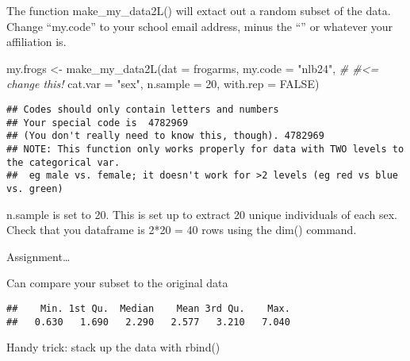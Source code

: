 \documentclass[
]{book}
\newenvironment{Shaded}{\begin{snugshade}}{\end{snugshade}}
\newcommand{\AttributeTok}[1]{\textcolor[rgb]{0.77,0.63,0.00}{#1}}
\newcommand{\CommentTok}[1]{\textcolor[rgb]{0.56,0.35,0.01}{\textit{#1}}}
\newcommand{\ConstantTok}[1]{\textcolor[rgb]{0.00,0.00,0.00}{#1}}
\newcommand{\DecValTok}[1]{\textcolor[rgb]{0.00,0.00,0.81}{#1}}
\newcommand{\FunctionTok}[1]{\textcolor[rgb]{0.00,0.00,0.00}{#1}}
\newcommand{\NormalTok}[1]{#1}
\newcommand{\OtherTok}[1]{\textcolor[rgb]{0.56,0.35,0.01}{#1}}
\newcommand{\SpecialCharTok}[1]{\textcolor[rgb]{0.00,0.00,0.00}{#1}}
\newcommand{\StringTok}[1]{\textcolor[rgb]{0.31,0.60,0.02}{#1}}
\begin{document}
The function make\_my\_data2L() will extact out a random subset of the data. Change ``my.code'' to your school email address, minus the ``\citet{pitt.edu}'' or whatever your affiliation is.

\begin{Shaded}
\begin{Highlighting}[]
\NormalTok{my.frogs }\OtherTok{\textless{}{-}} \FunctionTok{make\_my\_data2L}\NormalTok{(}\AttributeTok{dat =}\NormalTok{ frogarms, }
                           \AttributeTok{my.code =} \StringTok{"nlb24"}\NormalTok{, }\CommentTok{\# \#\textless{}=  change this!}
                           \AttributeTok{cat.var =} \StringTok{"sex"}\NormalTok{,}
                           \AttributeTok{n.sample =} \DecValTok{20}\NormalTok{, }
                           \AttributeTok{with.rep =} \ConstantTok{FALSE}\NormalTok{)}
\end{Highlighting}
\end{Shaded}

\begin{verbatim}
## Codes should only contain letters and numbers
## Your special code is  4782969
## (You don't really need to know this, though). 4782969
## NOTE: This function only works properly for data with TWO levels to the categorical var.
##  eg male vs. female; it doesn't work for >2 levels (eg red vs blue vs. green)
\end{verbatim}

n.sample is set to 20. This is set up to extract 20 unique individuals of each sex. Check that you dataframe is 2*20 = 40 rows using the dim() command.

Assignment\ldots{}

Can compare your subset to the original data

\begin{Shaded}
\end{Shaded}

\begin{verbatim}
##    Min. 1st Qu.  Median    Mean 3rd Qu.    Max. 
##   0.630   1.690   2.290   2.577   3.210   7.040
\end{verbatim}

Handy trick: stack up the data with rbind()

\begin{Shaded}
\end{Shaded}
\end{document}
